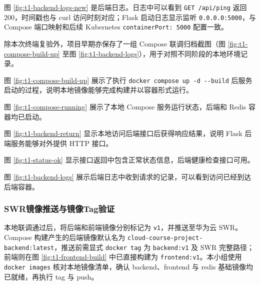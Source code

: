 
图 \ref{fig:t1-backend-logs-new} 是后端日志。日志中可以看到 \verb|GET /api/ping| 返回 200，时间戳也与 curl 访问时刻对应；Flask 启动日志显示监听 \verb|0.0.0.0:5000|，与 Compose 端口映射和后续 Kubernetes \verb|containerPort: 5000| 配置一致。

除本次终端复验外，项目早期亦保存了一组 Compose 联调归档截图（图 \ref{fig:t1-compose-build-up} 至图 \ref{fig:t1-backend-logs}），用于对照不同阶段的本地环境记录。


图 \ref{fig:t1-compose-build-up} 展示了执行 \verb|docker compose up -d --build| 后服务启动的过程，说明本地镜像能够完成构建并以容器形式运行。


图 \ref{fig:t1-compose-running} 展示了本地 Compose 服务运行状态，后端和 Redis 容器均已启动。


图 \ref{fig:t1-backend-return} 显示本地访问后端接口后获得响应结果，说明 Flask 后端服务能够对外提供 HTTP 接口。


图 \ref{fig:t1-status-ok} 显示接口返回中包含正常状态信息，后端健康检查接口可用。


图 \ref{fig:t1-backend-logs} 展示后端日志中收到请求的记录，可以看到访问已经到达后端容器。

\subsubsection{SWR镜像推送与镜像Tag验证}

本地联调通过后，将后端和前端镜像分别标记为 \verb|v1|，并推送至华为云 SWR。Compose 构建产生的后端镜像默认名为 \verb|cloud-course-project-backend:latest|，推送前需显式 \verb|docker tag| 为 \verb|backend:v1| 及 SWR 完整路径；前端则在图 \ref{fig:t1-frontend-build} 中已直接构建为 \verb|frontend:v1|。本小组使用 \verb|docker images| 核对本地镜像清单，确认 backend、frontend 与 redis 基础镜像均已就绪，再执行 tag 与 push。

